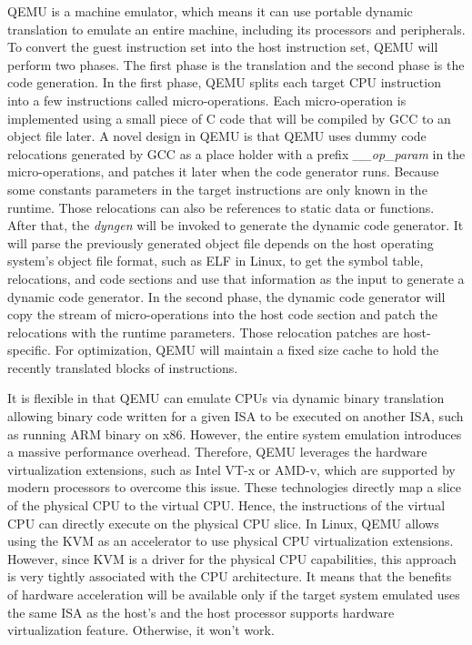 QEMU is a machine emulator, which means it can use portable dynamic translation to emulate an entire machine, including its processors and peripherals. To convert the guest instruction set into the host instruction set, QEMU will perform two phases. The first phase is the translation and the second phase is the code generation. In the first phase, QEMU splits each target CPU instruction into a few instructions called micro-operations. Each micro-operation is implemented using a small piece of C code that will be compiled by GCC to an object file later. A novel design in QEMU is that QEMU uses dummy code relocations generated by GCC as a place holder with a prefix \emph{__op_param} in the micro-operations, and patches it later when the code generator runs. Because some constants parameters in the target instructions are only known in the runtime. Those relocations can also be references to static data or functions. After that, the \emph{dyngen} will be invoked to generate the dynamic code generator. It will parse the previously generated object file depends on the host operating system's object file format, such as ELF in Linux, to get the symbol table, relocations, and code sections and use that information as the input to generate a dynamic code generator. In the second phase, the dynamic code generator will copy the stream of micro-operations into the host code section and patch the relocations with the runtime parameters. Those relocation patches are host-specific. For optimization, QEMU will maintain a fixed size cache to hold the recently translated blocks of instructions. 

It is flexible in that QEMU can emulate CPUs via dynamic binary translation allowing binary code written for a given ISA to be executed on another ISA, such as running ARM binary on x86. However, the entire system emulation introduces a massive performance overhead. Therefore, QEMU leverages the hardware virtualization extensions,  such as Intel VT-x or AMD-v, which are supported by modern processors to overcome this issue. These technologies directly map a slice of the physical CPU to the virtual CPU. Hence, the instructions of the virtual CPU can directly execute on the physical CPU slice. In Linux, QEMU allows using the KVM as an accelerator to use physical CPU virtualization extensions. However, since KVM is a driver for the physical CPU capabilities, this approach is very tightly associated with the CPU architecture. It means that the benefits of hardware acceleration will be available only if the target system emulated uses the same ISA as the host's and the host processor supports hardware virtualization feature. Otherwise, it won't work.

